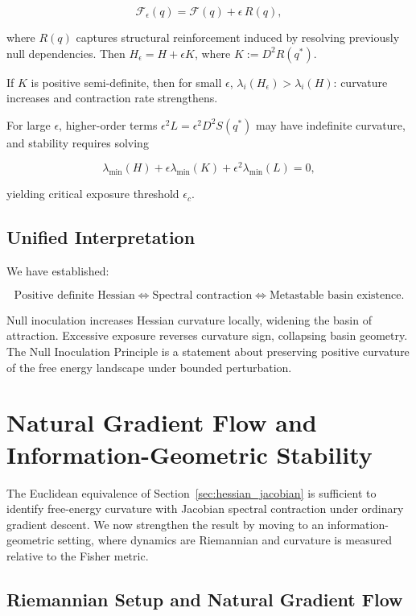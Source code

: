 \documentclass[11pt]{article}
\theoremstyle{remark}
\begin{document}
\[
\mathcal{F}_\epsilon(q)
=
\mathcal{F}(q)
+
\epsilon \, R(q),
\]

where $R(q)$ captures structural reinforcement induced by resolving previously null dependencies. Then $H_\epsilon = H + \epsilon K$, where $K := D^2 R(q^*)$.

If $K$ is positive semi-definite, then for small $\epsilon$, $\lambda_i(H_\epsilon) > \lambda_i(H)$: curvature increases and contraction rate strengthens.

For large $\epsilon$, higher-order terms $\epsilon^2 L = \epsilon^2 D^2 S(q^*)$ may have indefinite curvature, and stability requires solving

\[
\lambda_{\min}(H) + \epsilon \lambda_{\min}(K) + \epsilon^2 \lambda_{\min}(L) = 0,
\]

yielding critical exposure threshold $\epsilon_c$.

\subsection{Unified Interpretation}

We have established:

\[
\text{Positive definite Hessian}
\iff
\text{Spectral contraction}
\iff
\text{Metastable basin existence}.
\]

Null inoculation increases Hessian curvature locally, widening the basin of attraction. Excessive exposure reverses curvature sign, collapsing basin geometry. The Null Inoculation Principle is a statement about preserving positive curvature of the free energy landscape under bounded perturbation.

\section{Natural Gradient Flow and Information-Geometric Stability}
\label{sec:natural_gradient}

The Euclidean equivalence of Section~\ref{sec:hessian_jacobian} is sufficient to identify free-energy curvature with Jacobian spectral contraction under ordinary gradient descent. We now strengthen the result by moving to an information-geometric setting, where dynamics are Riemannian and curvature is measured relative to the Fisher metric.

\subsection{Riemannian Setup and Natural Gradient Flow}
\end{document}
